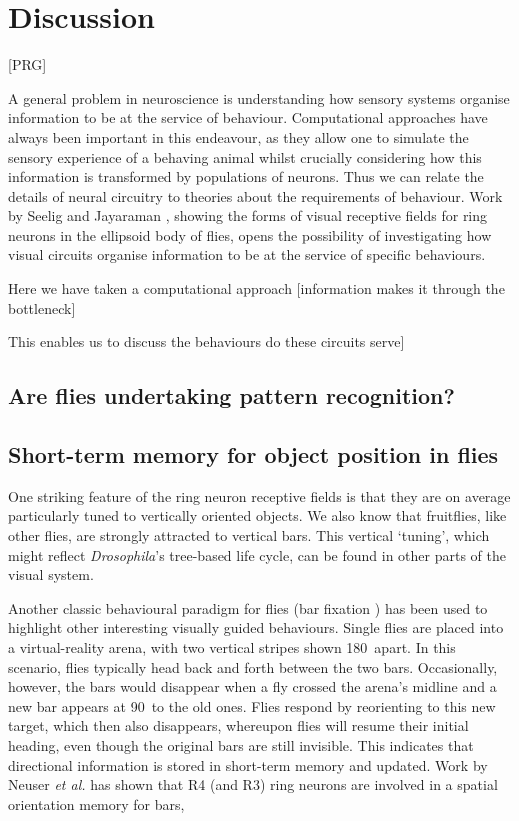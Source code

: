 \section*{Discussion}
[PRG]

A general problem in neuroscience is understanding how sensory systems organise information to be at the service of behaviour. Computational approaches have always been important in this endeavour, as they allow one to simulate the sensory experience of a behaving animal whilst crucially considering how this information is transformed by populations of neurons. Thus we can relate the details of neural circuitry to theories about the requirements of behaviour.
Work by Seelig and Jayaraman \cite{Seelig2013}, showing the forms of visual receptive fields for ring neurons in the ellipsoid body of flies, opens the possibility of investigating how visual circuits organise information to be at the service of specific behaviours.

Here we have taken a computational approach [information makes it through the bottleneck]

This enables us to discuss the behaviours do these circuits serve]




\subsection*{Are flies undertaking pattern recognition?}

\subsection*{Short-term memory for object position in flies}

One striking feature of the ring neuron receptive fields is that they are on average particularly tuned to vertically oriented objects.
We also know that fruitflies, like other flies, are strongly attracted to vertical bars.
This vertical `tuning', which might reflect \emph{Drosophila}'s tree-based life cycle, can be found in other parts of the visual system.

Another classic behavioural paradigm for flies (bar fixation \cite{Neuser2008}) has been used to highlight other interesting visually guided behaviours.
Single flies are placed into a virtual-reality arena, with two vertical stripes shown 180\degree\ apart.
In this scenario, flies typically head back and forth between the two bars.
Occasionally, however, the bars would disappear when a fly crossed the arena's midline and a new bar appears at 90\degree\ to the old ones.
Flies respond by reorienting to this new target, which then also disappears, whereupon flies will resume their initial heading, even though the original bars are still invisible. This indicates that directional information is stored in short-term memory and updated. Work by Neuser \emph{et al.} \cite{Neuser2008} has shown that R4 (and R3) ring neurons are involved in a spatial orientation memory for bars, 

